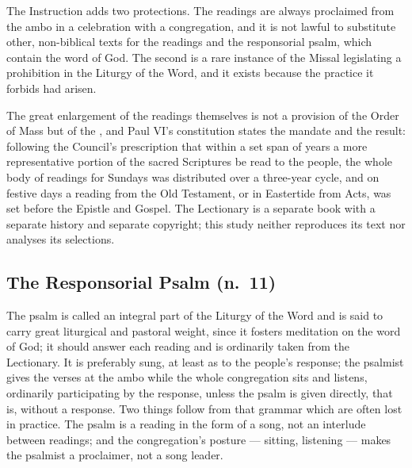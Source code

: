 The Instruction adds two protections. The readings are always proclaimed from the ambo in a
celebration with a congregation, and it is not lawful to substitute other, non-biblical texts
for the readings and the responsorial psalm, which contain the word of God. The second is a rare instance
of the Missal legislating a prohibition in the Liturgy of the Word, and it exists because the
practice it forbids had arisen.

The great enlargement of the readings themselves is not a provision of the Order of Mass but of
the , and Paul VI's constitution states the mandate and the
result: following the Council's prescription that within a set span of years a more
representative portion of the sacred Scriptures be read to the people, the whole body of
readings for Sundays was distributed over a three-year cycle, and on festive days a reading
from the Old Testament, or in Eastertide from Acts, was set before the Epistle and
Gospel. The Lectionary is a separate book with a separate history and separate copyright; this
study neither reproduces its text nor analyses its selections.

\subsection{The Responsorial Psalm (n.\ 11)}

The psalm is called an integral part of the Liturgy of the Word and is said to carry great
liturgical and pastoral weight, since it fosters meditation on the word of God; it should
answer each reading and is ordinarily taken from the Lectionary. It is preferably sung, at
least as to the people's response; the psalmist gives the verses at the ambo while the whole
congregation sits and listens, ordinarily participating by the response, unless the psalm is
given directly, that is, without a response. Two things follow from that grammar
which are often lost in practice. The psalm is a reading in the form of a song, not an
interlude between readings; and the congregation's posture --- sitting, listening --- makes the
psalmist a proclaimer, not a song leader.

